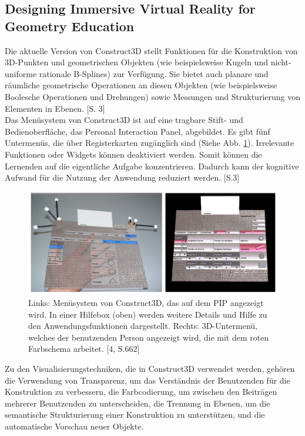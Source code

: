 \documentclass[deutsch]{llncs}
\begin{document}
\subsection{Designing Immersive Virtual Reality for Geometry Education}
\label{subsec:}
Die aktuelle Version von Construct3D stellt Funktionen für die Konstruktion von 3D-Punkten und geometrischen Objekten (wie beispielsweise Kugeln und
 nicht-uniforme rationale B-Splines) zur Verfügung. Sie bietet auch planare und räumliche geometrische Operationen an diesen Objekten
 (wie beispielsweise Boolesche Operationen und Drehungen) sowie Messungen und Strukturierung von Elementen in Ebenen. [S. 3]\\
Das Menüsystem von Construct3D ist auf eine tragbare Stift- und Bedienoberfläche, das Personal Interaction Panel, abgebildet. Es gibt fünf Untermenüs, die über Registerkarten zugänglich sind (Siehe Abb. \ref{UI}). Irrelevante Funktionen oder Widgets können deaktiviert werden. Somit können die 
Lernenden auf die eigentliche Aufgabe konzentrieren. Dadurch kann der kognitive Aufwand für die Nutzung der Anwendung reduziert werden. [S.3]\\
\begin{figure}
\begin{center}
\includegraphics[scale=0.3]{Bilder/UI.PNG}
\caption{Links: Menüsystem von Construct3D, das auf dem PIP angezeigt wird. In einer Hilfebox (oben) werden weitere Details und Hilfe zu den Anwendungsfunktionen dargestellt. Rechts: 3D-Untermenü, welches der benutzenden Person angezeigt wird, die mit dem roten Farbschema arbeitet. [4, S.662]}
\label{UI}
\end{center}
\end{figure} 
Zu den Visualisierungstechniken, die in Construct3D verwendet werden, gehören die Verwendung von Transparenz, um das Verständnis der 
Benutzenden für die Konstruktion zu verbessern, die Farbcodierung, um zwischen den Beiträgen mehrerer Benutzenden zu unterscheiden, 
die Trennung in Ebenen, um die semantische Strukturierung einer Konstruktion zu unterstützen, und die automatische Vorschau neuer Objekte. 
\end{document}
